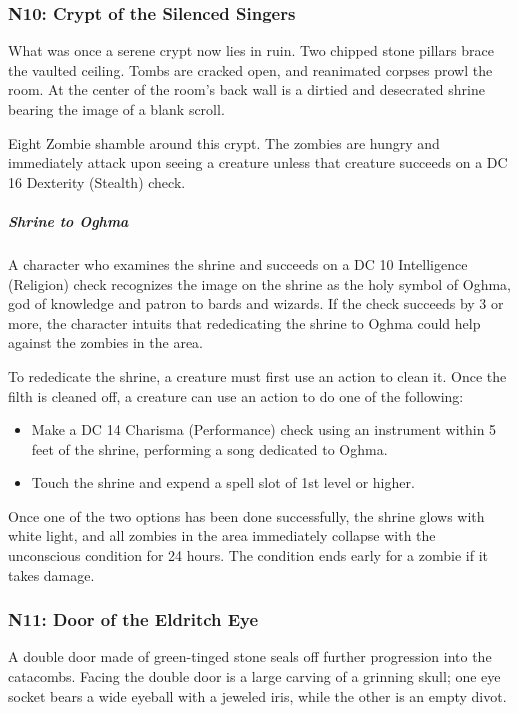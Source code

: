 \documentclass[10pt,a4paper,twoside,bg=print,twocolumn,openany,nodeprecatedcode]{dndbook}
\begin{document}
\subsubsection{N10: Crypt of the Silenced Singers}
\begin{DndReadAloud}{}
What was once a serene crypt now lies in ruin. Two chipped stone pillars brace the vaulted ceiling. Tombs are cracked open, and reanimated corpses prowl the room. At the center of the room's back wall is a dirtied and desecrated shrine bearing the image of a blank scroll.
\end{DndReadAloud}

Eight Zombie shamble around this crypt. The zombies are hungry and immediately attack upon seeing a creature unless that creature succeeds on a DC 16 Dexterity (Stealth) check.
\subparagraph{Shrine to Oghma}
A character who examines the shrine and succeeds on a DC 10 Intelligence (Religion) check recognizes the image on the shrine as the holy symbol of Oghma, god of knowledge and patron to bards and wizards. If the check succeeds by 3 or more, the character intuits that rededicating the shrine to Oghma could help against the zombies in the area.

To rededicate the shrine, a creature must first use an action to clean it. Once the filth is cleaned off, a creature can use an action to do one of the following:

\begin{itemize}
\item Make a DC 14 Charisma (Performance) check using an instrument within 5 feet of the shrine, performing a song dedicated to Oghma.
\item Touch the shrine and expend a spell slot of 1st level or higher.
\end{itemize}

Once one of the two options has been done successfully, the shrine glows with white light, and all zombies in the area immediately collapse with the unconscious condition for 24 hours. The condition ends early for a zombie if it takes damage.
\subsubsection{N11: Door of the Eldritch Eye}
\begin{DndReadAloud}{}
A double door made of green-tinged stone seals off further progression into the catacombs. Facing the double door is a large carving of a grinning skull; one eye socket bears a wide eyeball with a jeweled iris, while the other is an empty divot.
\end{DndReadAloud}
\end{document}
